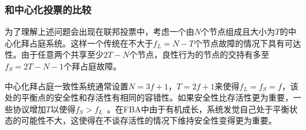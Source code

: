 \subsubsection{和中心化投票的比较}

为了理解上述问题会出现在联邦投票中，考虑一个由$N$个节点组成且{\quorum}大小为$T$的中心化拜占庭系统。这样一个传统在不大于$f_L=N-T$个节点故障的情况下具有{\quorum}可达性。由于任意两个{\quorum}共享至少$2T-N$个节点，良性行为的节点的{\quorum}交持有多至$f_S=2T-N-1$个拜占庭故障。

中心化拜占庭一致性系统通常设置$N=3f+1$，$T=2f+1$来使得$f_L=f_S=f$，该处的平衡点的安全性和存活性有相同的容错性。如果安全性比存活性更为重要，一些协议增加$T$以使得$f_S>f_L$~\cite{Li:2007:BOF:1973430.1973440}。在FBA中由于{\quorum}有机成长，系统发觉自己处于平衡状态的可能性不大，这使得在不谈存活性的情况下维持安全性变得更为重要。

